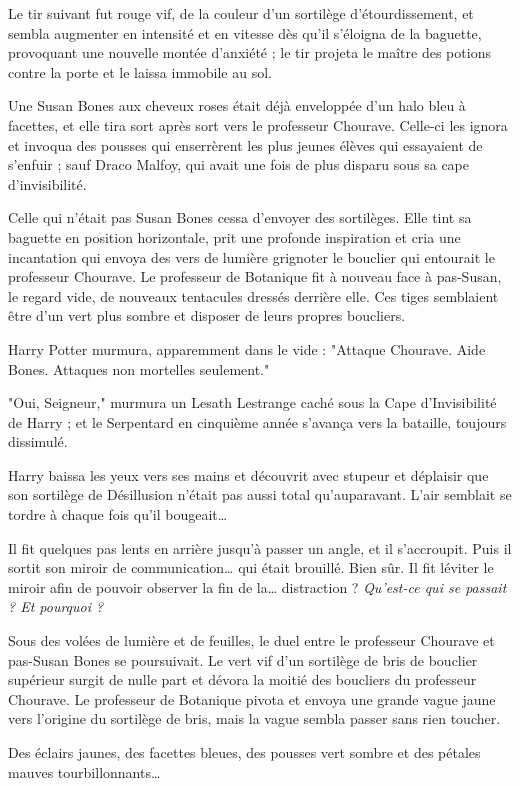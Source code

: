 Le tir suivant fut rouge vif, de la couleur d'un sortilège d'étourdissement, et sembla augmenter en intensité et en vitesse dès qu'il s'éloigna de la baguette, provoquant une nouvelle montée d'anxiété ; le tir projeta le maître des potions contre la porte et le laissa immobile au sol.

Une Susan Bones aux cheveux roses était déjà enveloppée d'un halo bleu à facettes, et elle tira sort après sort vers le professeur Chourave. Celle-ci les ignora et invoqua des pousses qui enserrèrent les plus jeunes élèves qui essayaient de s'enfuir ; sauf Draco Malfoy, qui avait une fois de plus disparu sous sa cape d'invisibilité.

Celle qui n'était pas Susan Bones cessa d'envoyer des sortilèges. Elle tint sa baguette en position horizontale, prit une profonde inspiration et cria une incantation qui envoya des vers de lumière grignoter le bouclier qui entourait le professeur Chourave. Le professeur de Botanique fit à nouveau face à pas-Susan, le regard vide, de nouveaux tentacules dressés derrière elle. Ces tiges semblaient être d'un vert plus sombre et disposer de leurs propres boucliers.

Harry Potter murmura, apparemment dans le vide : "Attaque Chourave. Aide Bones. Attaques non mortelles seulement."

"Oui, Seigneur," murmura un Lesath Lestrange caché sous la Cape d'Invisibilité de Harry ; et le Serpentard en cinquième année s'avança vers la bataille, toujours dissimulé.

Harry baissa les yeux vers ses mains et découvrit avec stupeur et déplaisir que son sortilège de Désillusion n'était pas aussi total qu'auparavant. L'air semblait se tordre à chaque fois qu'il bougeait…

Il fit quelques pas lents en arrière jusqu'à passer un angle, et il s'accroupit. Puis il sortit son miroir de communication… qui était brouillé. Bien sûr. Il fit léviter le miroir afin de pouvoir observer la fin de la… distraction ? \emph{Qu'est-ce qui se passait ? Et pourquoi ?} 

Sous des volées de lumière et de feuilles, le duel entre le professeur Chourave et pas-Susan Bones se poursuivait. Le vert vif d'un sortilège de bris de bouclier supérieur surgit de nulle part et dévora la moitié des boucliers du professeur Chourave. Le professeur de Botanique pivota et envoya une grande vague jaune vers l'origine du sortilège de bris, mais la vague sembla passer sans rien toucher.

Des éclairs jaunes, des facettes bleues, des pousses vert sombre et des pétales mauves tourbillonnants…


